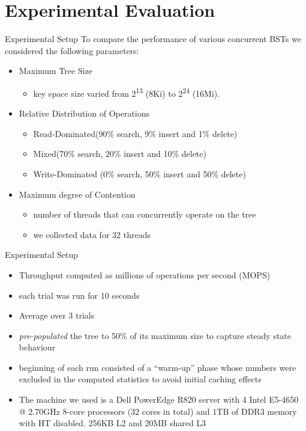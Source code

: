 \documentclass{beamer}
\begin{document}
\section{Experimental Evaluation}
\begin{frame}{Experimental Setup}
To compare the performance of various concurrent BSTs we considered the following parameters:
\begin{itemize}
\item Maximum Tree Size
  \begin{itemize}
  \item key space size varied from 2\textsuperscript{13} (8Ki) to 2\textsuperscript{24} (16Mi).
  \end{itemize}
\item Relative Distribution of Operations
  \begin{itemize}
  \item Read-Dominated\phantom{1}(90\% search, \phantom{1}9\% insert and \phantom{1}1\% delete)
  \item Mixed\phantom{1234567890}(70\% search, 20\% insert and 10\% delete)
  \item Write-Dominated (\phantom{1}0\% search, 50\% insert and 50\% delete)
  \end{itemize}
\item Maximum degree of Contention
  \begin{itemize}
  \item number of threads that can concurrently operate on the tree
  \item we collected data for 32 threads
  \end{itemize}
\end{itemize}
\end{frame}

\begin{frame}{Experimental Setup}
\small
{
\begin{itemize}
\item Throughput computed as millions of operations per second (MOPS)
\item each trial was run for 10 seconds
\item Average over 3 trials
\item \textit{pre-populated} the tree to 50\% of its maximum size to capture steady state behaviour
\item beginning of each run consisted of a ``warm-up'' phase whose numbers were excluded in the computed statistics to avoid initial caching effects
\item The machine we used is a Dell PowerEdge R820 server with 4 Intel E5-4650 @ 2.70GHz 8-core processors (32 cores in total) and 1TB of DDR3 memory with HT disabled. 256KB L2 and 20MB shared L3
\end{itemize}
}
\end{frame}
\end{document}
